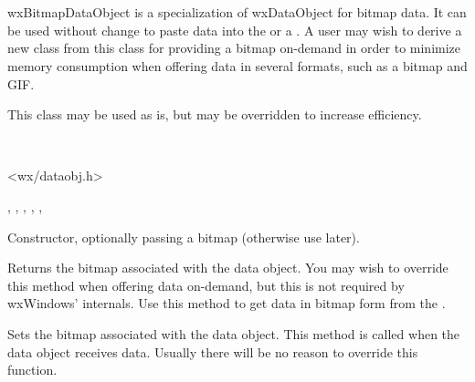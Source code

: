 \section{}\label{wxbitmapdataobject}

wxBitmapDataObject is a specialization of wxDataObject for bitmap data. It can
be used without change to paste data into the 
 or a . A
user may wish to derive a new class from this class for providing a bitmap
on-demand in order to minimize memory consumption when offering data in several
formats, such as a bitmap and GIF.



This class may be used as is, but 
 may be overridden to increase
efficiency.


\\


<wx/dataobj.h>


, 
, 
, 
, 
, 


Constructor, optionally passing a bitmap (otherwise use 
 later).

\label{wxbitmapdataobjectgetbitmap}


Returns the bitmap associated with the data object. You may wish to override
this method when offering data on-demand, but this is not required by
wxWindows' internals. Use this method to get data in bitmap form from
the .

\label{wxbitmapdataobjectsetbitmap}


Sets the bitmap associated with the data object. This method is called when the
data object receives data. Usually there will be no reason to override this
function.

